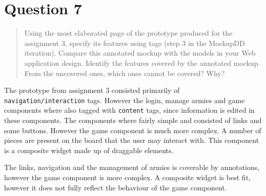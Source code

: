 \documentclass[10pt,a4paper]{report}
\begin{document}
\section{Question 7}
\begin{quote}
Using the most elaborated page of the prototype produced for the assignment 3, specify its features using tags (step 3 in the MockupDD iteration). Compare this annotated mockup with the models in your Web application design. Identify the features covered by the annotated mockup. From the uncovered ones, which ones cannot be covered? Why?
\end{quote}
The prototype from assignment 3 consisted primarily of \texttt{navigation/interaction} tags. However the login, manage armies and game components where also tagged with \texttt{content} tags, since information is edited in these components. The components where fairly simple and consisted of links and some buttons. However the game component is much more complex. A number of pieces are present on the board that the user may interact with. This component is a composite widget made up of draggable elements.

The links, navigation and the management of armies is coverable by annotations, however the game component is more complex. A composite widget is best fit, however it does not fully reflect the behaviour of the game component.
\end{document}
